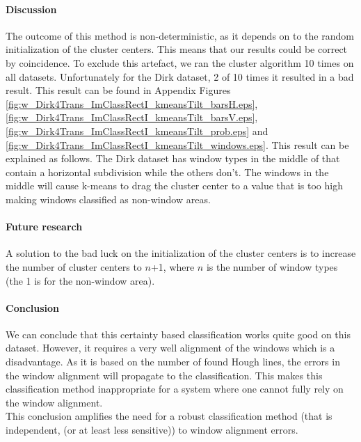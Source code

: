 

\paragraph{Discussion}  %
The outcome of this method is non-deterministic, as it depends on to the random
initialization of the cluster centers. This means that our results could be
correct by coincidence.  To exclude this artefact, we ran the cluster algorithm
10 times on all datasets. Unfortunately for the Dirk dataset, 2 of 10 times it 
resulted in a bad result. This result can be found in Appendix
Figures \ref{fig:w_Dirk4Trans_ImClassRectI_kmeansTilt_barsH.eps},
\ref{fig:w_Dirk4Trans_ImClassRectI_kmeansTilt_barsV.eps},
\ref{fig:w_Dirk4Trans_ImClassRectI_kmeansTilt_prob.eps} and
\ref{fig:w_Dirk4Trans_ImClassRectI_kmeansTilt_windows.eps}.
This result can be explained as follows. The Dirk dataset has window types in the
middle of that contain a horizontal subdivision while the others don't.
The windows in the middle will cause k-means to drag the cluster center to a
value that is too high making windows classified as non-window areas.

\paragraph{Future research}
A solution to the bad luck on the initialization of the cluster centers 
is to increase the number of cluster centers to $n$+1, 
where $n$ is the number of window types (the 1 is for the non-window area).


\paragraph{Conclusion}
We can conclude that this certainty based classification works quite good on
this dataset.  However, it requires a very well alignment of the windows which
is a disadvantage.  As it is based on the number of found Hough lines, the
errors in the window alignment will propagate to the classification.  This
makes this classification method inappropriate for a system where one cannot
fully rely on the window alignment.  \\
This conclusion amplifies the need for a robust classification method (that is
independent, (or at least less sensitive)) to window alignment errors.


